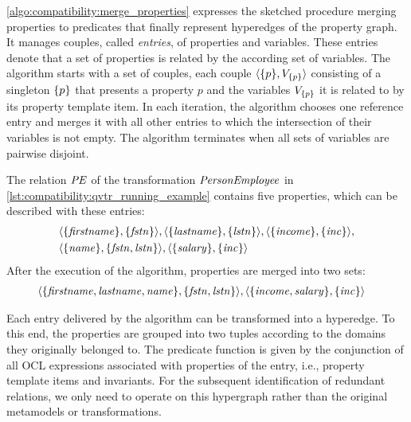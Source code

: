 \autoref{algo:compatibility:merge_properties} expresses the sketched procedure merging properties to predicates that finally represent hyperedges of the property graph.
It manages couples, called \emph{entries}, of properties and \qvtr variables.
These entries denote that a set of properties is related by the according set of \qvtr variables.
The algorithm starts with a set of couples, each couple $\langle \{ p \}, V_{\{ p \}} \rangle$ consisting of a singleton $\{ p \}$ that presents a property $p$ and the \qvtr variables $V_{\{ p \}}$ it is related to by its property template item.
In each iteration, the algorithm chooses one reference entry and merges it with all other entries to which the intersection of their \qvtr variables is not empty.
The algorithm terminates when all sets of \qvtr variables are pairwise disjoint.


\begin{example}
The relation $\mathit{PE}$ of the \qvtr transformation $\mathit{PersonEmployee}$ in \autoref{lst:compatibility:qvtr_running_example} contains five properties, which can be described with these entries:
\begin{align*}
&
    \langle \{ \mathit{firstname} \}, \{ \mathit{fstn} \} \rangle, 
    \langle \{ \mathit{lastname} \}, \{ \mathit{lstn} \} \rangle,
    \langle \{ \mathit{income} \}, \{ \mathit{inc} \} \rangle, \\ 
&
    \langle \{ \mathit{name} \}, \{ \mathit{fstn}, \mathit{lstn} \} \rangle,
    \langle \{ \mathit{salary} \}, \{ \mathit{inc} \} \rangle
\end{align*}
After the execution of the algorithm, properties are merged into two sets:
\begin{align*}
&
    \tupled{\setted{\propdisplay{firstname}, \propdisplay{lastname}, \propdisplay{name}}, \setted{\mathvariable{fstn}, \mathvariable{lstn}}}, %
    \tupled{\setted{\propdisplay{income}, \propdisplay{salary}}, \setted{\mathvariable{inc}}}
\end{align*}
\end{example}

Each entry delivered by the algorithm can be transformed into a hyperedge.
To this end, the properties are grouped into two tuples according to the domains they originally belonged to.
The predicate function is given by the conjunction of all \gls{OCL} expressions associated with properties of the entry, i.e., property template items and invariants.
For the subsequent identification of redundant relations, we only need to operate on this hypergraph rather than the original metamodels or \qvtr transformations.

